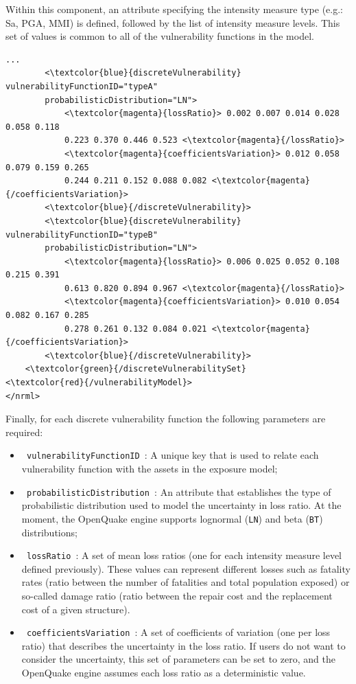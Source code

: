 Within this component, an attribute specifying the intensity measure type (e.g.: Sa, PGA, MMI) is defined, followed by the list of intensity measure levels. This set of values is common to all of the \glspl{vulnerability function} in the model.

\begin{Verbatim}[frame=single, commandchars=\\\{\}, samepage=true]
        ...
        <\textcolor{blue}{discreteVulnerability}  vulnerabilityFunctionID="typeA" 
        probabilisticDistribution="LN">
            <\textcolor{magenta}{lossRatio}> 0.002 0.007 0.014 0.028 0.058 0.118
            0.223 0.370 0.446 0.523 <\textcolor{magenta}{/lossRatio}>
            <\textcolor{magenta}{coefficientsVariation}> 0.012 0.058 0.079 0.159 0.265 
            0.244 0.211 0.152 0.088 0.082 <\textcolor{magenta}{/coefficientsVariation}>
        <\textcolor{blue}{/discreteVulnerability}>
        <\textcolor{blue}{discreteVulnerability}  vulnerabilityFunctionID="typeB" 
        probabilisticDistribution="LN">
            <\textcolor{magenta}{lossRatio}> 0.006 0.025 0.052 0.108 0.215 0.391	
            0.613 0.820 0.894 0.967 <\textcolor{magenta}{/lossRatio}>
            <\textcolor{magenta}{coefficientsVariation}> 0.010 0.054 0.082 0.167 0.285 
            0.278 0.261 0.132 0.084 0.021 <\textcolor{magenta}{/coefficientsVariation}>
        <\textcolor{blue}{/discreteVulnerability}>
    <\textcolor{green}{/discreteVulnerabilitySet} 
<\textcolor{red}{/vulnerabilityModel}>        
</nrml>
\end{Verbatim}

Finally, for each discrete \gls{vulnerability function} the following parameters are required:
\begin{itemize}
\item  \Verb+ vulnerabilityFunctionID +: A unique key that is used to relate each \gls{vulnerability function} with the \glspl{asset} in the \gls{exposure model};
\item  \Verb+ probabilisticDistribution +: An attribute that establishes the type of probabilistic distribution used to model the uncertainty in loss ratio. At the moment, the OpenQuake engine supports lognormal (\Verb+LN+) and beta (\Verb+BT+) distributions;
\item  \Verb+ lossRatio +: A set of mean loss ratios (one for each intensity measure level defined previously). These values can represent different losses such as fatality rates (ratio between the number of fatalities and total population exposed) or so-called damage ratio (ratio between the repair cost and the replacement cost of a given structure).
\item  \Verb+ coefficientsVariation +: A set of coefficients of variation (one per loss ratio) that describes the uncertainty in the loss ratio. If users do not want to consider the uncertainty, this set of parameters can be set to zero, and the OpenQuake engine assumes each loss ratio as a deterministic value. 
\end{itemize}

